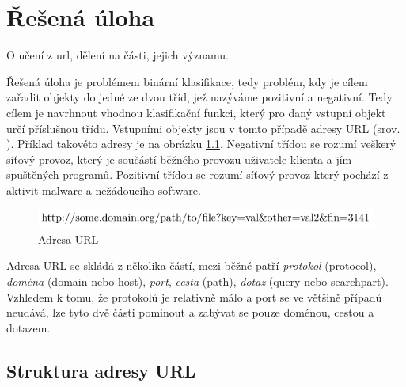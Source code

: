 \chapter{Řešená úloha}

O učení z url, dělení na části, jejich významu.

Řešená úloha je problémem binární klasifikace, tedy problém, kdy je cílem zařadit objekty do jedné ze dvou tříd, jež nazýváme pozitivní a negativní. Tedy cílem je navrhnout vhodnou klasifikační funkci, který pro daný vstupní objekt určí příslušnou třídu. Vstupními objekty jsou v tomto případě adresy URL (srov. \cite{berners-lee_uniform_1994}). Příklad takovéto adresy je na obrázku \ref{url}. Negativní třídou se rozumí veškerý síťový provoz, který je součástí běžného provozu uživatele-klienta a jím spuštěných programů. Pozitivní třídou se rozumí síťový provoz který pochází z aktivit malware a nežádoucího software.

\begin{figure}[h]
	\caption{Adresa URL}\label{url}
	\centering
	\includegraphics{images/url/url.pdf}
\end{figure}

Adresa URL se skládá z několika částí, mezi běžné patří \textit{protokol} (\textenglish{protocol}), \textit{doména} (\textenglish{domain} nebo \textenglish{host}), \textit{port}, \textit{cesta} (\textenglish{path}), \textit{dotaz} (\textenglish{query} nebo \textenglish{searchpart}). Vzhledem k tomu, že protokolů je relativně málo a port se ve většině případů neudává, lze tyto dvě části pominout a zabývat se pouze doménou, cestou a dotazem.

\section{Struktura adresy URL}\label{URL_structure}

